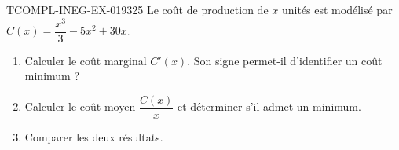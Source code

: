 \begin{exercice}{TCOMPL-INEG-EX-019}{3}{25}
Le coût de production de $x$ unités est modélisé par $C(x) = \dfrac{x^3}{3} - 5x^2 + 30x$.
\begin{enumerate}
  \item Calculer le coût marginal $C'(x)$. Son signe permet-il d'identifier un coût minimum ?
  \item Calculer le coût moyen $\dfrac{C(x)}{x}$ et déterminer s'il admet un minimum.
  \item Comparer les deux résultats.
\end{enumerate}

\end{exercice}
